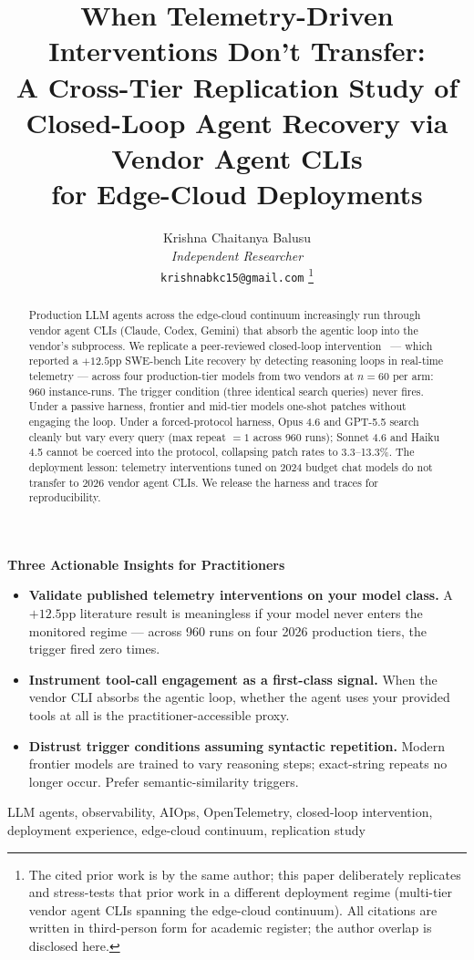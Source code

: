 \documentclass[journal]{IEEEtran}
\title{When Telemetry-Driven Interventions Don't Transfer:\\A Cross-Tier Replication Study of\\Closed-Loop Agent Recovery via Vendor Agent CLIs\\for Edge-Cloud Deployments}
\author{
  Krishna Chaitanya Balusu \\
  \textit{Independent Researcher} \\
  \texttt{krishnabkc15@gmail.com}
  \thanks{The cited prior work \cite{aiware2026} is by the same author; this paper deliberately replicates and stress-tests that prior work in a different deployment regime (multi-tier vendor agent CLIs spanning the edge-cloud continuum). All citations are written in third-person form for academic register; the author overlap is disclosed here.}
}
\begin{document}
\maketitle

\begin{framed}
\noindent\textbf{Three Actionable Insights for Practitioners}
\begin{itemize}[leftmargin=*,nosep]
\item \textbf{Validate published telemetry interventions on your model class.} A $+12.5$pp literature result is meaningless if your model never enters the monitored regime --- across 960 runs on four 2026 production tiers, the trigger fired zero times.
\item \textbf{Instrument tool-call engagement as a first-class signal.} When the vendor CLI absorbs the agentic loop, whether the agent uses your provided tools at all is the practitioner-accessible proxy.
\item \textbf{Distrust trigger conditions assuming syntactic repetition.} Modern frontier models are trained to vary reasoning steps; exact-string repeats no longer occur. Prefer semantic-similarity triggers.
\end{itemize}
\end{framed}

\begin{abstract}
Production LLM agents across the edge-cloud continuum increasingly run through vendor agent CLIs (Claude, Codex, Gemini) that absorb the agentic loop into the vendor's subprocess. We replicate a peer-reviewed closed-loop intervention~\cite{aiware2026} --- which reported a $+12.5$pp SWE-bench Lite recovery by detecting reasoning loops in real-time telemetry --- across four production-tier models from two vendors at $n{=}60$ per arm: 960 instance-runs. The trigger condition (three identical search queries) never fires. Under a passive harness, frontier and mid-tier models one-shot patches without engaging the loop. Under a forced-protocol harness, Opus 4.6 and GPT-5.5 search cleanly but vary every query (max repeat $=1$ across 960 runs); Sonnet 4.6 and Haiku 4.5 cannot be coerced into the protocol, collapsing patch rates to 3.3--13.3\%. The deployment lesson: telemetry interventions tuned on 2024 budget chat models do not transfer to 2026 vendor agent CLIs. We release the harness and traces for reproducibility.
\end{abstract}

\begin{IEEEkeywords}
LLM agents, observability, AIOps, OpenTelemetry, closed-loop intervention, deployment experience, edge-cloud continuum, replication study
\end{IEEEkeywords}
\end{document}
